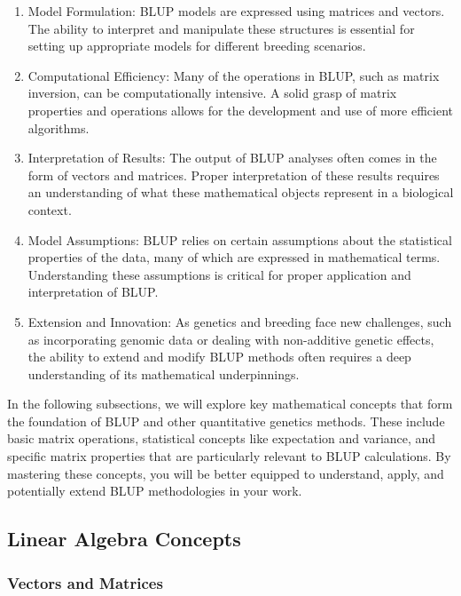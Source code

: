 \documentclass[12pt,a4paper]{article}
\begin{document}
\begin{enumerate}
    \item Model Formulation: BLUP models are expressed using matrices and vectors. The ability to interpret and manipulate these structures is essential for setting up appropriate models for different breeding scenarios.

    \item Computational Efficiency: Many of the operations in BLUP, such as matrix inversion, can be computationally intensive. A solid grasp of matrix properties and operations allows for the development and use of more efficient algorithms.

    \item Interpretation of Results: The output of BLUP analyses often comes in the form of vectors and matrices. Proper interpretation of these results requires an understanding of what these mathematical objects represent in a biological context.

    \item Model Assumptions: BLUP relies on certain assumptions about the statistical properties of the data, many of which are expressed in mathematical terms. Understanding these assumptions is critical for proper application and interpretation of BLUP.

    \item Extension and Innovation: As genetics and breeding face new challenges, such as incorporating genomic data or dealing with non-additive genetic effects, the ability to extend and modify BLUP methods often requires a deep understanding of its mathematical underpinnings.
\end{enumerate}

In the following subsections, we will explore key mathematical concepts that form the foundation of BLUP and other quantitative genetics methods. These include basic matrix operations, statistical concepts like expectation and variance, and specific matrix properties that are particularly relevant to BLUP calculations. By mastering these concepts, you will be better equipped to understand, apply, and potentially extend BLUP methodologies in your work.

\subsection{Linear Algebra Concepts}

\subsubsection{Vectors and Matrices}
\end{document}
